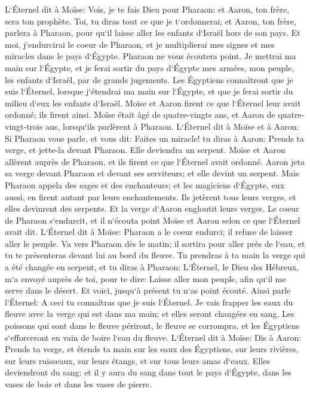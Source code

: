 \verse L`Éternel dit à Moïse: Vois, je te fais Dieu pour Pharaon: et Aaron, ton frère, sera ton prophète. 
\verse Toi, tu diras tout ce que je t`ordonnerai; et Aaron, ton frère, parlera à Pharaon, pour qu`il laisse aller les enfants d`Israël hors de son pays. 
\verse Et moi, j`endurcirai le coeur de Pharaon, et je multiplierai mes signes et mes miracles dans le pays d`Égypte. 
\verse Pharaon ne vous écoutera point. Je mettrai ma main sur l`Égypte, et je ferai sortir du pays d`Égypte mes armées, mon peuple, les enfants d`Israël, par de grands jugements. 
\verse Les Égyptiens connaîtront que je suis l`Éternel, lorsque j`étendrai ma main sur l`Égypte, et que je ferai sortir du milieu d`eux les enfants d`Israël. 
\verse Moïse et Aaron firent ce que l`Éternel leur avait ordonné; ils firent ainsi. 
\verse Moïse était âgé de quatre-vingts ans, et Aaron de quatre-vingt-trois ans, lorsqu`ils parlèrent à Pharaon. 
\verse L`Éternel dit à Moïse et à Aaron: 
\verse Si Pharaon vous parle, et vous dit: Faites un miracle! tu diras à Aaron: Prends ta verge, et jette-la devant Pharaon. Elle deviendra un serpent. 
\verse Moïse et Aaron allèrent auprès de Pharaon, et ils firent ce que l`Éternel avait ordonné. Aaron jeta sa verge devant Pharaon et devant ses serviteurs; et elle devint un serpent. 
\verse Mais Pharaon appela des sages et des enchanteurs; et les magiciens d`Égypte, eux aussi, en firent autant par leurs enchantements. 
\verse Ils jetèrent tous leurs verges, et elles devinrent des serpents. Et la verge d`Aaron engloutit leurs verges. 
\verse Le coeur de Pharaon s`endurcit, et il n`écouta point Moïse et Aaron selon ce que l`Éternel avait dit. 
\verse L`Éternel dit à Moïse: Pharaon a le coeur endurci; il refuse de laisser aller le peuple. 
\verse Va vers Pharaon dès le matin; il sortira pour aller près de l`eau, et tu te présenteras devant lui au bord du fleuve. Tu prendras à ta main la verge qui a été changée en serpent, 
\verse et tu diras à Pharaon: L`Éternel, le Dieu des Hébreux, m`a envoyé auprès de toi, pour te dire: Laisse aller mon peuple, afin qu`il me serve dans le désert. Et voici, jusqu`à présent tu n`as point écouté. 
\verse Ainsi parle l`Éternel: A ceci tu connaîtras que je suis l`Éternel. Je vais frapper les eaux du fleuve avec la verge qui est dans ma main; et elles seront changées en sang. 
\verse Les poissons qui sont dans le fleuve périront, le fleuve se corrompra, et les Égyptiens s`efforceront en vain de boire l`eau du fleuve. 
\verse L`Éternel dit à Moïse: Dis à Aaron: Prends ta verge, et étends ta main sur les eaux des Égyptiens, sur leurs rivières, sur leurs ruisseaux, sur leurs étangs, et sur tous leurs amas d`eaux. Elles deviendront du sang: et il y aura du sang dans tout le pays d`Égypte, dans les vases de bois et dans les vases de pierre. 
